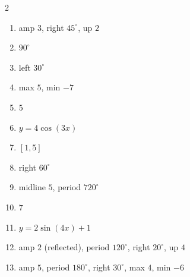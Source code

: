 \documentclass[11pt]{article}
\begin{document}
\begin{keybox}
\begin{multicols}{2}
\small
\begin{enumerate}[leftmargin=*,itemsep=3pt]
  \item amp $3$, right $45^\circ$, up $2$
  \item $90^\circ$
  \item left $30^\circ$
  \item max $5$, min $-7$
  \item $5$
  \item $y=4\cos(3x)$
  \item $[1,5]$
  \item right $60^\circ$
  \item midline $5$, period $720^\circ$
  \item $7$
  \item $y=2\sin(4x)+1$
  \item amp $2$ (reflected), period $120^\circ$, right $20^\circ$, up $4$
  \item amp $5$, period $180^\circ$, right $30^\circ$, max $4$, min $-6$
\end{enumerate}
\end{multicols}
\end{keybox}
\end{document}

